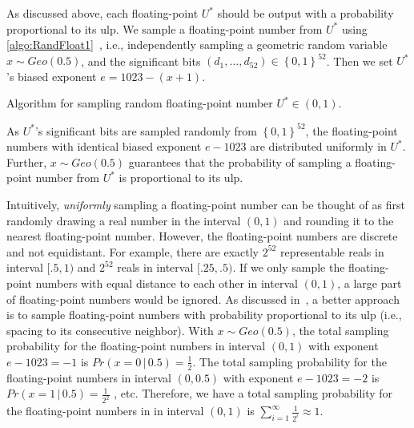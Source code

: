 As discussed above, each floating-point $U^{*}$ should be output with a probability proportional to its ulp. We sample a floating-point number from $U^{*}$ using \autoref{algo:RandFloat1}~\cite{walker1974fast,mironov2012significance}, i.e., independently sampling a geometric random variable $x \sim Geo\left(0.5\right) $, and the significant bits $\left(d_{1},\ldots ,d_{52}\right)\in\left\{0,1\right\}^{52} $. Then we set $U^{*}$'s biased exponent $e=1023-\left(x+1\right) $.

\begin{algorithm}[tbh!]
    \centering
    \caption{Algorithm for sampling random floating-point number $U^{*}\in\left(0,1\right) $.}
    \label{algo:RandFloat1}
\end{algorithm}
\FloatBarrier

As $U^{*}$'s significant bits are sampled randomly from $\left\{0,1\right\}^{52} $, the floating-point numbers with identical biased exponent $e-1023$ are distributed uniformly in $U^{*}$.
Further, $x \sim Geo\left(0.5\right) $ guarantees that the probability of sampling a floating-point number from $U^{*}$ is proportional to its ulp.

Intuitively, \textit{uniformly} sampling a floating-point number can be thought of as first randomly drawing a real number in the interval $\left(0,1\right) $ and rounding it to the nearest floating-point number. However, the floating-point numbers are discrete and not equidistant. For example, there are exactly $2^{52}$ representable reals in interval $[.5, 1)$ and $2^{52}$ reals in interval $[ .25, .5)$. If we only sample the floating-point numbers with equal distance to each other in interval $\left(0,1\right) $, a large part of floating-point numbers would be ignored. As discussed in~\cite{walker1974fast,mironov2012significance}, a better approach is to sample floating-point numbers with probability proportional to its ulp (i.e., spacing to its consecutive neighbor).
With $x\sim Geo\left(0.5\right) $, the total sampling probability for the floating-point numbers in interval $(0,1)$ with exponent $e-1023=-1$ is $Pr\left(x=0 \,|\,0.5\right) =\frac{1}{2}$.
The total sampling probability for the floating-point numbers in interval $(0,0.5)$ with exponent $e-1023=-2$ is $Pr\left(x=1\,|\,0.5\right) =\frac{1}{2^2}$ , etc.
Therefore, we have a total sampling probability for the floating-point numbers in in interval $\left(0,1\right)$ is $\sum_{i = 1}^{\infty}\frac{1}{2^{i}}\approx 1$.


